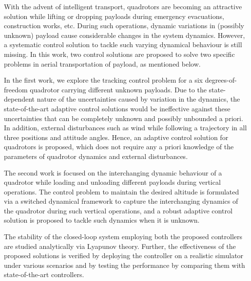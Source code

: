 With the advent of intelligent transport, quadrotors are becoming an attractive solution while lifting or dropping payloads during emergency evacuations, construction works, etc. During such operations, dynamic variations in (possibly unknown) payload cause considerable changes in the system dynamics. However, a systematic control solution to tackle such varying dynamical behaviour is still missing. In this work, two control solutions are proposed to solve two specific problems in aerial transportation of payload, as mentioned below.

In the first work, we explore the tracking control problem for a six degrees-of-freedom quadrotor carrying different unknown payloads. Due to the state-dependent nature of the uncertainties caused by variation in the dynamics, the state-of-the-art adaptive control solutions would be ineffective against these uncertainties that can be completely unknown and possibly unbounded a priori. In addition, external disturbances such as wind while following a trajectory in all three positions and attitude angles. Hence, an adaptive control solution for quadrotors is proposed, which does not require any a priori knowledge of the parameters of quadrotor dynamics and external disturbances.  

The second work is focused on the interchanging dynamic behaviour of a quadrotor while loading and unloading different payloads during vertical operations. %
The control problem to maintain the desired altitude is formulated via a switched dynamical framework to capture the interchanging dynamics of the quadrotor during such vertical operations, and a robust adaptive control solution is proposed to tackle such dynamics when it is unknown. 


The stability of the closed-loop system employing both the proposed controllers are studied analytically via Lyapunov theory. Further, the effectiveness of the proposed solutions is verified by deploying the controller on a realistic simulator under various scenarios and by testing the performance by comparing them with state-of-the-art controllers.

